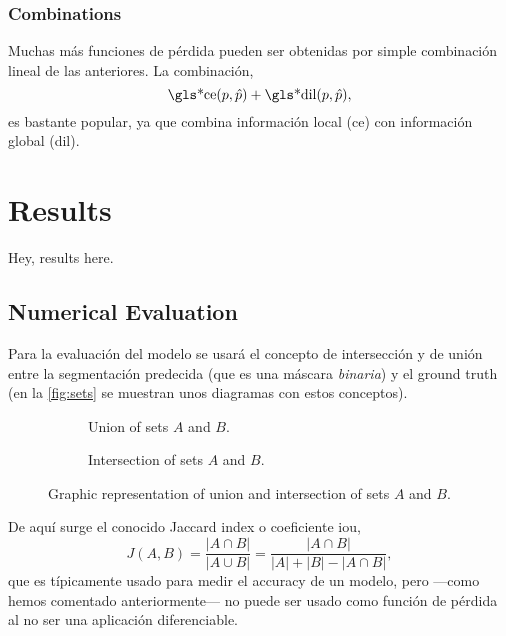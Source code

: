 \subsubsection{Combinations}
Muchas más funciones de pérdida pueden ser obtenidas por simple combinación
lineal de las anteriores. La combinación,
\begin{equation}
  \text{\gls*{ce}}(p, \hat{p}) + \text{\gls*{dil}}(p, \hat{p}),
\end{equation}
es bastante popular, ya que combina información local (\gls{ce}) con
información global (\gls{dil}).


\section{Results}
Hey, results here.

\subsection{Numerical Evaluation} \label{sec:evaluation}

Para la evaluación del modelo se usará el concepto de intersección y de unión
entre la segmentación predecida (que es una máscara \emph{binaria}) y el ground
truth (en la \vref{fig:sets} se muestran unos diagramas con estos
conceptos).

\begin{figure}[ht]
  \begin{subfigure}[t]{.5\textwidth}
    \centering
    \caption{Union of sets \(A\) and \(B\).}
    
  \end{subfigure}
  \begin{subfigure}[t]{.5\textwidth}
    \centering
    \caption{Intersection of sets \(A\) and \(B\).}
    
  \end{subfigure}
  \caption[Union and intersection of sets \(A\) and \(B\)]{Graphic
    representation of union and intersection of sets \(A\) and \(B\).}
  \label{fig:sets}
\end{figure}

De aquí surge el conocido Jaccard index o coeficiente \gls{iou},
\begin{equation}
  J(A,B) = \frac{|A \cap B|}{|A \cup B|}
  = \frac{|A \cap B|}{|A| + |B| - |A \cap B|},
\end{equation}
que es típicamente usado para medir el accuracy de un modelo, pero ---como
hemos comentado anteriormente--- no puede ser usado como función de pérdida al
no ser una aplicación diferenciable.

